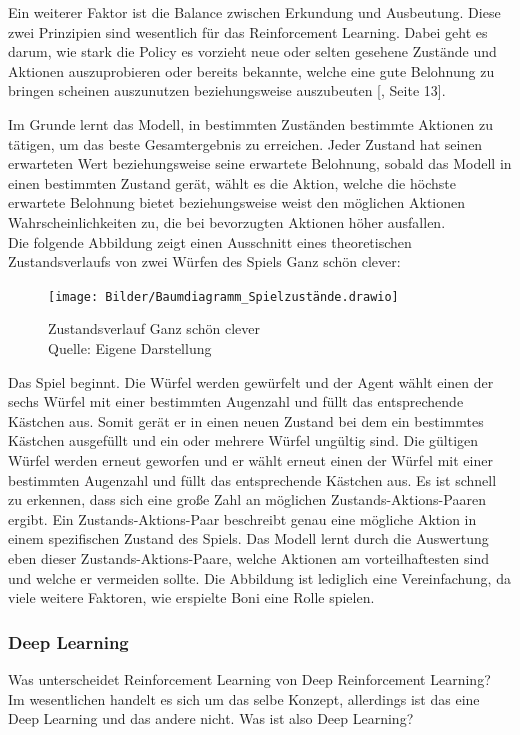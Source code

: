 Ein weiterer Faktor ist die Balance zwischen Erkundung und Ausbeutung. Diese zwei Prinzipien sind wesentlich für das Reinforcement Learning. Dabei geht es darum, wie stark die Policy es vorzieht neue oder selten gesehene Zustände und Aktionen auszuprobieren oder bereits bekannte, welche eine gute Belohnung zu bringen scheinen auszunutzen beziehungsweise auszubeuten [\cite{ris-ala_fundamentals_2023}, Seite 13].

Im Grunde lernt das Modell, in bestimmten Zuständen bestimmte Aktionen zu tätigen, um das beste Gesamtergebnis zu erreichen. Jeder Zustand hat seinen erwarteten Wert beziehungsweise seine erwartete Belohnung, sobald das Modell in einen bestimmten Zustand gerät, wählt es die Aktion, welche die höchste erwartete Belohnung bietet beziehungsweise weist den möglichen Aktionen Wahrscheinlichkeiten zu, die bei bevorzugten Aktionen höher ausfallen.\\

Die folgende Abbildung zeigt einen Ausschnitt eines theoretischen Zustandsverlaufs von zwei Würfen des Spiels Ganz schön clever:
\nopagebreak
\begin{figure}[h]
	\texttt{[image: Bilder/Baumdiagramm\_Spielzustände.drawio]} 
	\caption[Zustandsverlauf Ganz schön clever]{Zustandsverlauf Ganz schön clever\\ Quelle: Eigene Darstellung}
\end{figure}	

Das Spiel beginnt. Die Würfel werden gewürfelt und der Agent wählt einen der sechs Würfel mit einer bestimmten Augenzahl und füllt das entsprechende Kästchen aus. Somit gerät er in einen neuen Zustand bei dem ein bestimmtes Kästchen ausgefüllt und ein oder mehrere Würfel ungültig sind. Die gültigen Würfel werden erneut geworfen und er wählt erneut einen der Würfel mit einer bestimmten Augenzahl und füllt das entsprechende Kästchen aus. Es ist schnell zu erkennen, dass sich eine große Zahl an möglichen Zustands-Aktions-Paaren ergibt. Ein Zustands-Aktions-Paar beschreibt genau eine mögliche Aktion in einem spezifischen Zustand des Spiels. Das Modell lernt durch die Auswertung eben dieser Zustands-Aktions-Paare, welche Aktionen am vorteilhaftesten sind und welche er vermeiden sollte. Die Abbildung ist lediglich eine Vereinfachung, da viele weitere Faktoren, wie erspielte Boni eine Rolle spielen.
\subsubsection{Deep Learning}
Was unterscheidet Reinforcement Learning von Deep Reinforcement Learning? Im wesentlichen handelt es sich um das selbe Konzept, allerdings ist das eine Deep Learning und das andere nicht. Was ist also Deep Learning?

